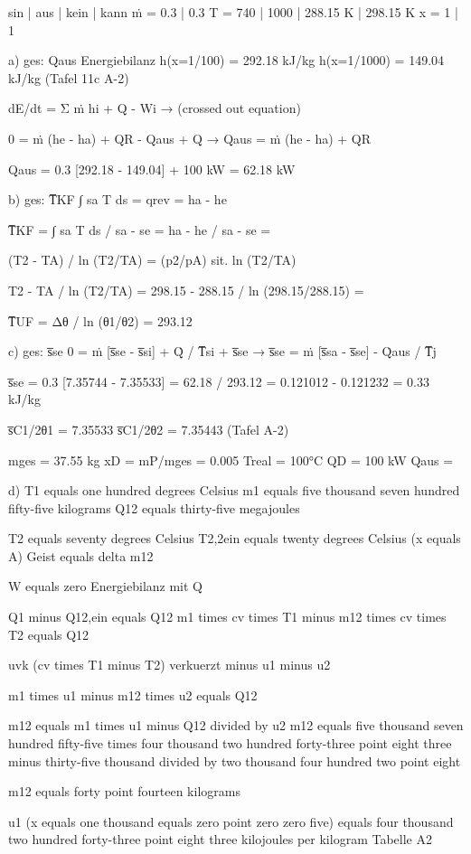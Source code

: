 sin | aus | kein | kann  
ṁ = 0.3 | 0.3  
T = 740 | 1000 | 288.15 K | 298.15 K  
x = 1 | 1  

a) ges: Qaus  
Energiebilanz  
h(x=1/100) = 292.18 kJ/kg  
h(x=1/1000) = 149.04 kJ/kg  
(Tafel 11c A-2)  

dE/dt = Σ ṁ hi + Q - Wi → (crossed out equation)  

0 = ṁ (he - ha) + QR - Qaus + Q → Qaus = ṁ (he - ha) + QR  

Qaus = 0.3 [292.18 - 149.04] + 100 kW = 62.18 kW  

b) ges: T̅KF  
∫ sa T ds = qrev = ha - he  

T̅KF = ∫ sa T ds / sa - se = ha - he / sa - se =  

(T2 - TA) / ln (T2/TA) = (p2/pA)  
sit. ln (T2/TA)  

T2 - TA / ln (T2/TA) = 298.15 - 288.15 / ln (298.15/288.15) =  

T̅UF = Δθ / ln (θ1/θ2) = 293.12  

c) ges: s̅se  
0 = ṁ [s̅se - s̅si] + Q̇ / T̅si + s̅se → s̅se = ṁ [s̅sa - s̅se] - Q̇aus / T̅j  

s̅se = 0.3 [7.35744 - 7.35533] = 62.18 / 293.12 = 0.121012 - 0.121232 = 0.33 kJ/kg  

s̅C1/2θ1 = 7.35533  
s̅C1/2θ2 = 7.35443 (Tafel A-2)  

mges = 37.55 kg  
xD = mP/mges = 0.005  
Treal = 100°C  
QD = 100 kW  
Qaus =

d) T1 equals one hundred degrees Celsius  
m1 equals five thousand seven hundred fifty-five kilograms  
Q12 equals thirty-five megajoules  

T2 equals seventy degrees Celsius  
T2,2ein equals twenty degrees Celsius (x equals A)  
Geist equals delta m12  

W equals zero  
Energiebilanz mit Q  

Q1 minus Q12,ein equals Q12  
m1 times cv times T1 minus m12 times cv times T2 equals Q12  

uvk (cv times T1 minus T2) verkuerzt minus u1 minus u2  

m1 times u1 minus m12 times u2 equals Q12  

m12 equals m1 times u1 minus Q12 divided by u2  
m12 equals five thousand seven hundred fifty-five times four thousand two hundred forty-three point eight three minus thirty-five thousand divided by two thousand four hundred two point eight  

m12 equals forty point fourteen kilograms  

u1 (x equals one thousand equals zero point zero zero five) equals four thousand two hundred forty-three point eight three kilojoules per kilogram  
Tabelle A2  

